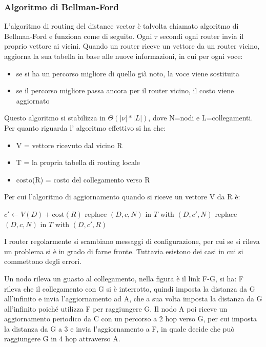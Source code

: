 \subsubsection{Algoritmo di Bellman-Ford}
L’algoritmo di routing del distance vector è talvolta chiamato algoritmo di Bellman-Ford e funziona come di seguito. Ogni $\tau$ secondi ogni router invia il proprio vettore ai vicini. Quando un router riceve un vettore da un router vicino, aggiorna la sua tabella in base alle nuove informazioni, in cui per ogni voce:
\begin{itemize}
  \item se si ha un percorso migliore di quello già noto, la voce viene sostituita
  \item se il percorso migliore passa ancora per il router vicino, il costo viene aggiornato
\end{itemize}
Questo algoritmo si stabilizza in $\Theta(|\nu|*|L|)$, dove N=nodi e L=collegamenti.\\ 
Per quanto riguarda l’ algoritmo effettivo si ha che:
\begin{itemize}
  \item V = vettore ricevuto dal vicino R
  \item T = la propria tabella di routing locale
  \item costo(R) = costo del collegamento verso R
\end{itemize}
Per cui l’algoritmo di aggiornamento quando si riceve un vettore V da R è:
\begin{algorithm}
\caption{Bellman-ford algorithm}
\begin{algorithmic}[1]
    \State $c' \gets V(D) + \text{cost}(R)$
        \State replace $(D, c, N)$ in $T$ with $(D, c', N)$
        \State replace $(D, c, N)$ in $T$ with $(D, c', R)$
    \EndIf
\EndFor
\end{algorithmic}
\end{algorithm}
I router regolarmente si scambiano messaggi di configurazione, per cui se si rileva un problema si è in grado di farne fronte. Tuttavia esistono dei casi in cui si commettono degli errori.
\begin{example}
  Un nodo rileva un guasto al collegamento, nella figura è il link F-G, si ha: F rileva che il collegamento con G si è interrotto, quindi imposta la distanza da G all’infinito e invia l’aggiornamento ad A, che a sua volta imposta la distanza da G all’infinito poiché utilizza F per raggiungere G. Il nodo A poi riceve un aggiornamento periodico da C con un percorso a 2 hop verso G, per cui imposta la distanza da G a 3 e invia l’aggiornamento a F, in quale decide che può raggiungere G in 4 hop attraverso A.
\end{example}

